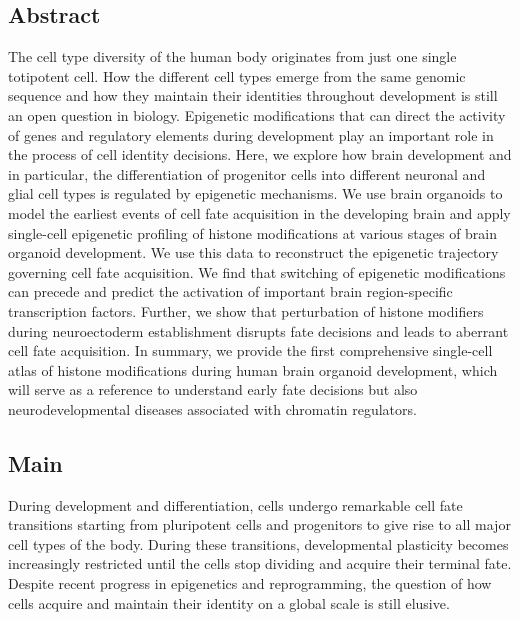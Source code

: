 \clearpage

\subsection{Abstract}

The cell type diversity of the human body originates from just one single totipotent cell. How the different cell types emerge from the same genomic sequence and how they maintain their identities throughout development is still an open question in biology. Epigenetic modifications that can direct the activity of genes and regulatory elements during development play an important role in the process of cell identity decisions.
Here, we explore how brain development and in particular, the differentiation of progenitor cells into different neuronal and glial cell types is regulated by epigenetic mechanisms. We use brain organoids to model the earliest events of cell fate acquisition in the developing brain and apply single-cell epigenetic profiling of histone modifications at various stages of brain organoid development. We use this data to reconstruct the epigenetic trajectory governing cell fate acquisition. We find that switching of epigenetic modifications can precede and predict the activation of important brain region-specific transcription factors. Further, we show that perturbation of histone modifiers during neuroectoderm establishment disrupts fate decisions and leads to aberrant cell fate acquisition. In summary, we provide the first comprehensive single-cell atlas of histone modifications during human brain organoid development, which will serve as a reference to understand early fate decisions but also neurodevelopmental diseases associated with chromatin regulators.


\subsection{Main}

During development and differentiation, cells undergo remarkable cell fate transitions starting from pluripotent cells and progenitors to give rise to all major cell types of the body. During these transitions, developmental plasticity becomes increasingly restricted until the cells stop dividing and acquire their terminal fate. Despite recent progress in epigenetics and reprogramming, the question of how cells acquire and maintain their identity on a global scale is still elusive. 

